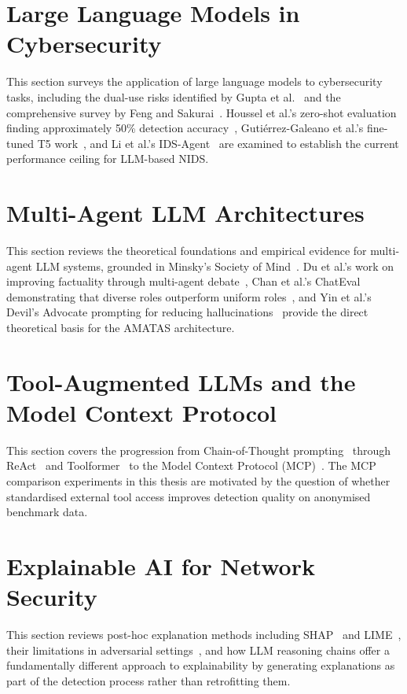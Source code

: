 \documentclass[12pt,openany,oneside,a4paper]{book}
\begin{document}
\section{Large Language Models in Cybersecurity}
\label{sec:llm-cybersecurity}
This section surveys the application of large language models to cybersecurity tasks, including the dual-use risks identified by Gupta et al.~\autocite{Gupta2023} and the comprehensive survey by Feng and Sakurai~\autocite{FengSakurai2025}. Houssel et al.'s zero-shot evaluation finding approximately 50\% detection accuracy~\autocite{Houssel2024}, Guti\'{e}rrez-Galeano et al.'s fine-tuned T5 work~\autocite{GutierrezGaleano2025}, and Li et al.'s IDS-Agent~\autocite{Li2024} are examined to establish the current performance ceiling for LLM-based NIDS.

\section{Multi-Agent LLM Architectures}
\label{sec:multi-agent-architectures}
This section reviews the theoretical foundations and empirical evidence for multi-agent LLM systems, grounded in Minsky's Society of Mind~\autocite{Minsky1986}. Du et al.'s work on improving factuality through multi-agent debate~\autocite{Du2023}, Chan et al.'s ChatEval demonstrating that diverse roles outperform uniform roles~\autocite{Chan2023}, and Yin et al.'s Devil's Advocate prompting for reducing hallucinations~\autocite{Yin2024} provide the direct theoretical basis for the AMATAS architecture.

\section{Tool-Augmented LLMs and the Model Context Protocol}
\label{sec:tool-augmented-llms}
This section covers the progression from Chain-of-Thought prompting~\autocite{Wei2022} through ReAct~\autocite{Yao2023} and Toolformer~\autocite{Schick2023} to the Model Context Protocol (MCP)~\autocite{Anthropic2024}. The MCP comparison experiments in this thesis are motivated by the question of whether standardised external tool access improves detection quality on anonymised benchmark data.

\section{Explainable AI for Network Security}
\label{sec:explainable-ai}
This section reviews post-hoc explanation methods including SHAP~\autocite{Lundberg2017} and LIME~\autocite{Ribeiro2016}, their limitations in adversarial settings~\autocite{Marino2018}, and how LLM reasoning chains offer a fundamentally different approach to explainability by generating explanations as part of the detection process rather than retrofitting them.
\end{document}
